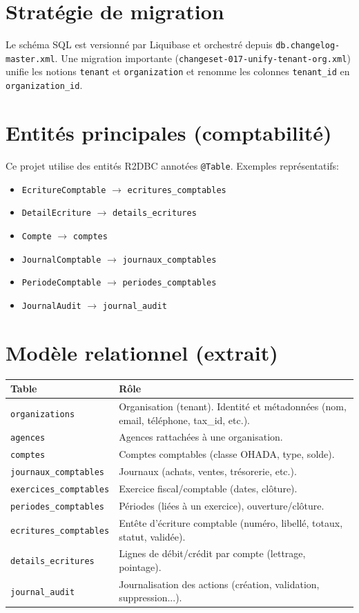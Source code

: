 \documentclass[12pt,a4paper]{report}
\begin{document}
\section{Stratégie de migration}
Le schéma SQL est versionné par Liquibase et orchestré depuis \texttt{db.changelog-master.xml}.
Une migration importante (\texttt{changeset-017-unify-tenant-org.xml}) unifie les notions \texttt{tenant} et \texttt{organization} et renomme les colonnes \texttt{tenant\_id} en \texttt{organization\_id}.

\section{Entités principales (comptabilité)}
Ce projet utilise des entités R2DBC annotées \texttt{@Table}.
Exemples représentatifs:
\begin{itemize}
  \item \texttt{EcritureComptable} \(\rightarrow\) \texttt{ecritures\_comptables}
  \item \texttt{DetailEcriture} \(\rightarrow\) \texttt{details\_ecritures}
  \item \texttt{Compte} \(\rightarrow\) \texttt{comptes}
  \item \texttt{JournalComptable} \(\rightarrow\) \texttt{journaux\_comptables}
  \item \texttt{PeriodeComptable} \(\rightarrow\) \texttt{periodes\_comptables}
  \item \texttt{JournalAudit} \(\rightarrow\) \texttt{journal\_audit}
\end{itemize}

\section{Modèle relationnel (extrait)}
\begin{longtable}{@{}p{4cm}p{10cm}@{}}
\toprule
\textbf{Table} & \textbf{Rôle} \\
\midrule
\endhead
\texttt{organizations} & Organisation (tenant). Identité et métadonnées (nom, email, téléphone, tax\_id, etc.). \\
\texttt{agences} & Agences rattachées à une organisation. \\
\texttt{comptes} & Comptes comptables (classe OHADA, type, solde). \\
\texttt{journaux\_comptables} & Journaux (achats, ventes, trésorerie, etc.). \\
\texttt{exercices\_comptables} & Exercice fiscal/comptable (dates, clôture). \\
\texttt{periodes\_comptables} & Périodes (liées à un exercice), ouverture/clôture. \\
\texttt{ecritures\_comptables} & Entête d'écriture comptable (numéro, libellé, totaux, statut, validée). \\
\texttt{details\_ecritures} & Lignes de débit/crédit par compte (lettrage, pointage). \\
\texttt{journal\_audit} & Journalisation des actions (création, validation, suppression...). \\
\bottomrule
\end{longtable}
\end{document}
